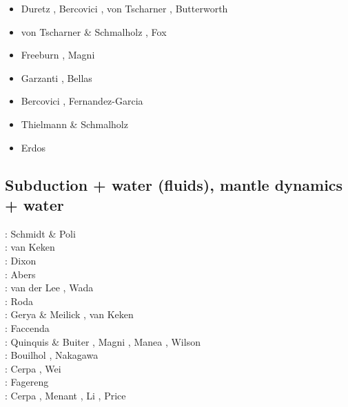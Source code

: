 \begin{scriptsize}
\begin{itemize}
\item[\twothousandfourteen] Duretz \etal \cite{dugs14}, Bercovici \etal \cite{besr14},
                            von Tscharner \etal \cite{vosd14}, Butterworth \etal \cite{butm14}
\item[\twothousandfifteen] von Tscharner \& Schmalholz \cite{vosc15}, Fox \etal \cite{fohk15}
\item[\twothousandseventeen] Freeburn \etal \cite{frbm17}, Magni \etal \cite{maav17}
\item[\twothousandeighteen] Garzanti \etal \cite{garm18}, Bellas \etal \cite{bezb18}
\item[\twothousandnineteen] Bercovici \etal \cite{beml19}, Fernandez-Garcia \etal \cite{fegb19}
\item[\twothousandtwenty] Thielmann \& Schmalholz \cite{thsc20}
\item[\twothousandtwentyone] Erdos \etal \cite{erhf21} 
\end{itemize}
\end{scriptsize}

\subsection{Subduction + water (fluids), mantle dynamics + water}

\begin{scriptsize}
\nineteenninetyeight: Schmidt \& Poli \cite{scpo98} \\
\twothousandtwo: van Keken \etal \cite{vakp02}\\
\twothousandfour: Dixon \etal \cite{didb04}\\
\twothousandsix: Abers \etal \cite{abvk06}\\
\twothousandeight: van der Lee \etal \cite{vary08}, Wada \etal \cite{wawh08}\\
\twothousandten: Roda \etal \cite{roms10}\\
\twothousandeleven: Gerya \& Meilick \cite{geme11}, van Keken \etal \cite{vahs11}\\
\twothousandtwelve: Faccenda \etal \cite{fagm12}\\
\twothousandfourteen: Quinquis \& Buiter \cite{qubu14}, Magni \etal \cite{mabv14}, 
                      Manea \etal \cite{malg14}, Wilson \etal \cite{wisv14}\\
\twothousandfifteen: Bouilhol \etal \cite{bomv15}, Nakagawa \etal \cite{nani15}\\
\twothousandseventeen: Cerpa \etal \cite{ceww17}, Wei \etal \cite{wewv17}\\
\twothousandeighteen: Fagereng \etal \cite{fade18}\\
\twothousandnineteen: Cerpa \etal \cite{ceww19}, Menant \etal \cite{meag19}, 
                      Li \etal \cite{ligc19}, Price \etal \cite{prdp19}
\end{scriptsize}

